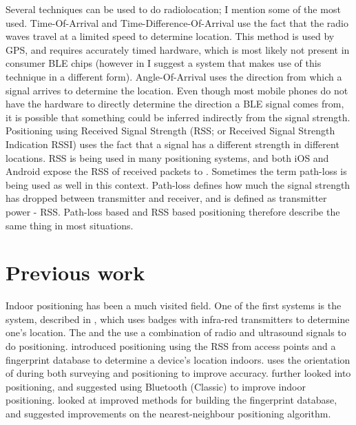 Several techniques can be used to do radiolocation; I mention some of the most used.
Time-Of-Arrival and Time-Difference-Of-Arrival use the fact that the radio waves travel at a limited speed to determine location.
This method is used by GPS, and requires accurately timed hardware, which is most likely not present in consumer BLE chips (however in  I suggest a system that makes use of this technique in a different form).
Angle-Of-Arrival uses the direction from which a signal arrives to determine the location.
Even though most mobile phones do not have the hardware to directly determine the direction a BLE signal comes from, it is possible that something could be inferred indirectly from the signal strength.
Positioning using Received Signal Strength (RSS; or Received Signal Strength Indication RSSI) uses the fact that a signal has a different strength in different locations.
RSS is being used in many \wifi positioning systems, and both iOS and Android expose the RSS of received packets to \apps.
Sometimes the term path-loss is being used as well in this context.
Path-loss defines how much the signal strength has dropped between transmitter and receiver, and is defined as transmitter power - RSS.
Path-loss based and RSS based positioning therefore describe the same thing in most situations.

\section{Previous work}
Indoor positioning has been a much visited field.
One of the first systems is the  system, described in \citet{want1992active}, which uses badges with infra-red transmitters to determine one's location.
The \citep{harter2002anatomy} and the \citep{cricket} use a combination of radio and ultrasound signals to do positioning.
\citet{bahl2000radar} introduced \wifi positioning using the RSS from \wifi access points and a fingerprint database to determine a device's location indoors.
\citet{king2006compass} uses the orientation of during both surveying and positioning to improve accuracy.
\citet{castro2001probabilistic} further looked into \wifi positioning, and \citet{pandya2003indoor} suggested using Bluetooth (Classic) to improve indoor positioning.
\citet{li2005method} looked at improved methods for building the fingerprint database, and \citet{shin2012enhanced} suggested improvements on the nearest-neighbour positioning algorithm.

